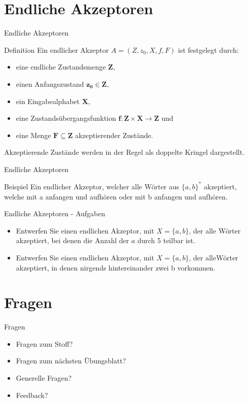 	\section{Endliche Akzeptoren}
	\begin{frame}{Endliche Akzeptoren}
		\begin{block}{Definition}
			Ein endlicher Akzeptor $A = (Z, z_0, X, f , F)$ ist festgelegt durch:\\
			\begin{itemize}
				\pause
				\item eine endliche Zustandsmenge $\mathbf{Z}$,
				\pause
				\item einen Anfangszustand $\mathbf{z_0 \in Z}$,
				\pause
				\item ein Eingabealphabet $\mathbf{X}$,
				\pause
				\item eine Zustandsübergangsfunktion $\mathbf{f: Z\times X \rightarrow Z}$ und
				\pause
				\item eine Menge $\mathbf{F \subseteq Z}$ akzeptierender Zustände.
			\end{itemize}
			Akzeptierende Zustände werden in der Regel als doppelte Kringel dargestellt.
		\end{block}
	\end{frame}		
	
	
	\begin{frame}{Endliche Akzeptoren}
		\begin{exampleblock}{Beispiel}
			Ein endlicher Akzeptor, welcher alle Wörter aus $\{a,b\}^*$ akzeptiert, welche mit a anfangen und aufhören oder mit b anfangen und aufhören.
		\end{exampleblock}
	\end{frame}
	
	
	\begin{frame}{Endliche Akzeptoren - Aufgaben}
		\begin{itemize}
			\item Entwerfen Sie einen endlichen Akzeptor, mit $X=\{a,b\}$, der alle Wörter akzeptiert, bei denen die Anzahl der $a$ durch 5 teilbar ist.
			\item Entwerfen Sie einen endlichen Akzeptor, mit $X=\{a,b\}$, der alleWörter akzeptiert, in denen nirgends hintereinander zwei b vorkommen.
		\end{itemize}
	\end{frame}
	
	
	
	\section{Fragen}
	\begin{frame} {Fragen}
		\begin{itemize}
			\item Fragen zum Stoff?
			\item Fragen zum n\"achsten \"Ubungsblatt?
			\item Generelle Fragen?
			\item Feedback?
		\end{itemize}
	\end{frame}	
		
